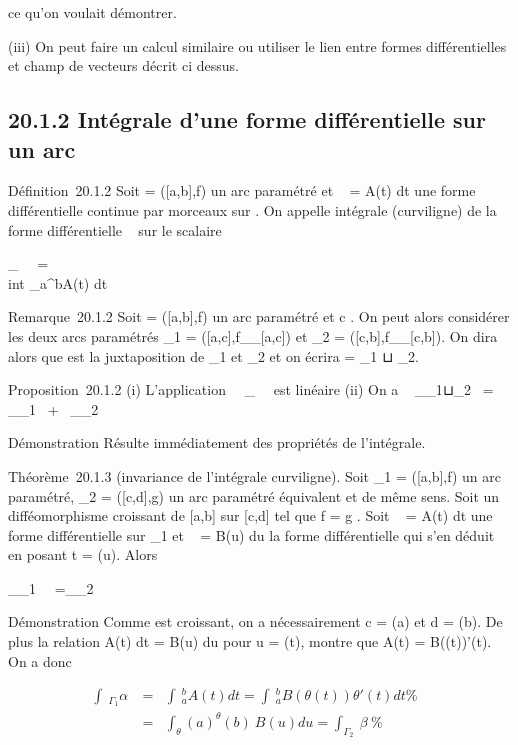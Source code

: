 \documentclass[]{article}
\begin{document}
ce qu'on voulait démontrer.

(iii) On peut faire un calcul similaire ou utiliser le lien entre formes
différentielles et champ de vecteurs décrit ci dessus.

\subsection{20.1.2 Intégrale d'une forme différentielle sur un arc}

Définition~20.1.2 Soit \Gamma = ([a,b],f) un arc paramétré et \alpha~ = A(t) dt
une forme différentielle continue par morceaux sur \Gamma. On appelle
intégrale (curviligne) de la forme différentielle \alpha~ sur \Gamma le scalaire

\int  _\Gamma~\alpha~ =\\int
 _a^bA(t) dt

Remarque~20.1.2 Soit \Gamma = ([a,b],f) un arc paramétré et c \in
[a,b]. On peut alors considérer les deux arcs paramétrés
\Gamma_1 = ([a,c],f__[a,c]) et
\Gamma_2 = ([c,b],f__[c,b]). On
dira alors que \Gamma est la juxtaposition de \Gamma_1 et \Gamma_2 et
on écrira \Gamma = \Gamma_1 ⊔ \Gamma_2.

Proposition~20.1.2 (i) L'application
\alpha~\mapsto~\int  _\Gamma~\alpha~
est linéaire (ii) On a \int ~
_\Gamma_1⊔\Gamma_2\alpha~ =\int ~
_\Gamma_1\alpha~ +\int ~
_\Gamma_2\alpha~

Démonstration Résulte immédiatement des propriétés de l'intégrale.

Théorème~20.1.3 (invariance de l'intégrale curviligne). Soit
\Gamma_1 = ([a,b],f) un arc paramétré, \Gamma_2 =
([c,d],g) un arc paramétré équivalent et de même sens. Soit \theta un
difféomorphisme croissant de [a,b] sur [c,d] tel que f = g \cdot \theta.
Soit \alpha~ = A(t) dt une forme différentielle sur \Gamma_1 et \beta~ = B(u)
du la forme différentielle qui s'en déduit en posant t = \theta(u). Alors

\int  _\Gamma_1~\alpha~
=\int  _\Gamma_2~\beta~

Démonstration Comme \theta est croissant, on a nécessairement c = \theta(a) et d =
\theta(b). De plus la relation A(t) dt = B(u) du pour u = \theta(t), montre que
A(t) = B(\theta(t))\theta'(t). On a donc

\begin{align*} \int ~
_\Gamma_1\alpha~& =& \int ~
_a^bA(t) dt =\int ~
_a^bB(\theta(t))\theta'(t) dt\%& \\
& =& \int  _\theta(a)^\theta(b)~B(u) du
=\int  _\Gamma_2~\beta~ \%&
\\ \end{align*}
\end{document}
